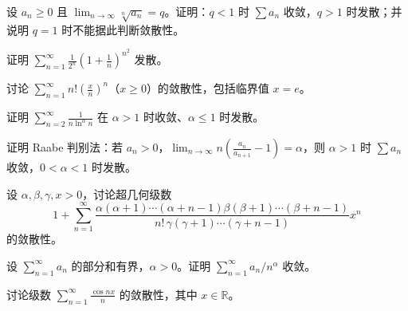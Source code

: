 \newpage
\noindent\begin{minipage}{\textwidth}
设 $a_n\ge0$ 且 $\lim_{n\to\infty}\sqrt[n]{a_n}=q$。证明：$q<1$ 时 $\sum a_n$ 收敛，$q>1$ 时发散；并说明 $q=1$ 时不能据此判断敛散性。
\end{minipage}\par\vfill
\noindent\begin{minipage}{\textwidth}
证明 $\displaystyle\sum_{n=1}^{\infty}\frac1{2^n}\left(1+\frac1n\right)^{n^2}$ 发散。
\end{minipage}\par\vfill
\noindent\begin{minipage}{\textwidth}
讨论 $\displaystyle\sum_{n=1}^{\infty}n!\left(\frac xn\right)^n$（$x\ge0$）的敛散性，包括临界值 $x=e$。
\end{minipage}\par\vfill
\noindent\begin{minipage}{\textwidth}
证明 $\displaystyle\sum_{n=2}^{\infty}\frac1{n\ln^\alpha n}$ 在 $\alpha>1$ 时收敛、$\alpha\le1$ 时发散。
\end{minipage}\par\vfill
\newpage
\noindent\begin{minipage}{\textwidth}
证明 Raabe 判别法：若 $a_n>0$，$\lim_{n\to\infty}n\left(\frac{a_n}{a_{n+1}}-1\right)=\alpha$，则 $\alpha>1$ 时 $\sum a_n$ 收敛，$0<\alpha<1$ 时发散。
\end{minipage}\par\vfill
\noindent\begin{minipage}{\textwidth}
设 $\alpha,\beta,\gamma,x>0$，讨论超几何级数\[1+\sum_{n=1}^{\infty}\frac{\alpha(\alpha+1)\cdots(\alpha+n-1)\beta(\beta+1)\cdots(\beta+n-1)}{n!\,\gamma(\gamma+1)\cdots(\gamma+n-1)}x^n\]的敛散性。
\end{minipage}\par\vfill
\noindent\begin{minipage}{\textwidth}
设 $\sum_{n=1}^{\infty}a_n$ 的部分和有界，$\alpha>0$。证明 $\sum_{n=1}^{\infty}a_n/n^\alpha$ 收敛。
\end{minipage}\par\vfill
\noindent\begin{minipage}{\textwidth}
讨论级数 $\displaystyle\sum_{n=1}^{\infty}\frac{\cos nx}{n}$ 的敛散性，其中 $x\in\mathbb R$。
\end{minipage}\par\vfill

